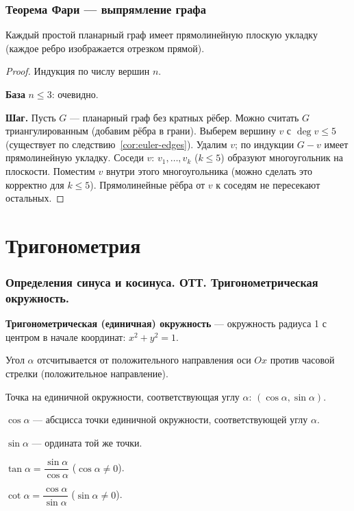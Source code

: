 \documentclass[12pt]{article}
\begin{document}
\section{Теорема Фари --- выпрямление графа}

\begin{theorem}[Фари, 1948]
Каждый простой планарный граф имеет прямолинейную плоскую укладку
(каждое ребро изображается отрезком прямой).
\end{theorem}

\begin{proof}
Индукция по числу вершин $n$.

\textbf{База} $n \leq 3$: очевидно.

\textbf{Шаг.} Пусть $G$ --- планарный граф без кратных рёбер.
Можно считать $G$ триангулированным (добавим рёбра в грани).
Выберем вершину $v$ с $\deg v \leq 5$ (существует по следствию~\ref{cor:euler-edges}).
Удалим $v$; по индукции $G - v$ имеет прямолинейную укладку.
Соседи $v$: $v_1,\ldots,v_k$ ($k \leq 5$) образуют многоугольник
на плоскости. Поместим $v$ внутри этого многоугольника
(можно сделать это корректно для $k \leq 5$).
Прямолинейные рёбра от $v$ к соседям не пересекают остальных.
\end{proof}

\part{Тригонометрия}

\section{Определения синуса и косинуса. ОТТ. Тригонометрическая окружность.}

\begin{definition}
\textbf{Тригонометрическая (единичная) окружность} --- окружность
радиуса 1 с центром в начале координат:
$x^2 + y^2 = 1$.

Угол $\alpha$ отсчитывается от положительного направления оси $Ox$
против часовой стрелки (положительное направление).

Точка на единичной окружности, соответствующая углу $\alpha$:
$(\cos\alpha, \sin\alpha)$.
\end{definition}

\begin{definition}
$\cos\alpha$ --- абсцисса точки единичной окружности,
соответствующей углу $\alpha$.

$\sin\alpha$ --- ордината той же точки.

$\tan\alpha = \dfrac{\sin\alpha}{\cos\alpha}$ ($\cos\alpha \neq 0$).

$\cot\alpha = \dfrac{\cos\alpha}{\sin\alpha}$ ($\sin\alpha \neq 0$).
\end{definition}
\end{document}
